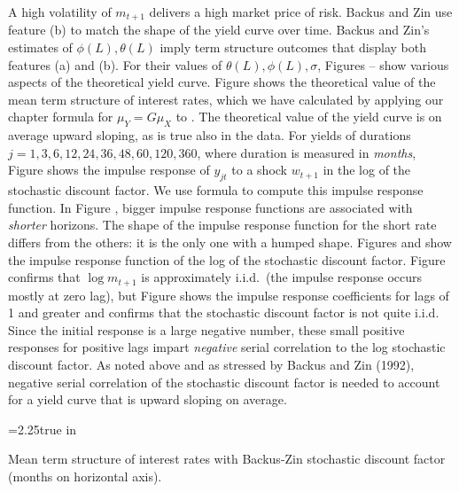 A high volatility of $m_{t+1}$ delivers a high market price of risk.
Backus and Zin use feature (b) to match
the shape of the yield curve over time.
   Backus and Zin's estimates of
$\phi(L), \theta(L)$ imply term structure
outcomes that display both features (a) and (b).
For  their values of $\theta(L), \phi(L), \sigma$,
Figures -- show various
aspects of the theoretical yield curve.
Figure  shows the theoretical value of the
 mean term structure of interest rates, which we
have calculated by applying our chapter   formula for $\mu_Y
= G \mu_X$ to . The theoretical value of the
yield curve is on average upward sloping, as is true
also in the data.   For yields of durations
  $j=1,3,6,12,24,36,48,60,120,360$,
where duration is measured in {\it months\/},
Figure  shows the impulse response of $y_{jt}$   to a shock
$w_{t+1}$ in the log of the stochastic discount factor. We use
formula  to compute this impulse response function.
 In Figure , bigger impulse response
functions are associated with {\it shorter\/} horizons.
The shape of the impulse response function for the short rate
differs from the others: it is the only one with a humped shape.
Figures  and  show the impulse response function
of the log of the stochastic discount factor. Figure  confirms that
$\log m_{t+1}$ is approximately i.i.d.\ (the impulse response occurs mostly
at zero lag), but Figure  shows the impulse response coefficients
for lags of 1 and greater and confirms that the stochastic discount factor
is not quite i.i.d.  Since the initial response   is a large
negative number, these small positive responses for positive lags
impart {\it negative\/}
serial correlation to the log stochastic
discount factor.  As noted above and as stressed by
Backus and Zin (1992),  negative
serial correlation of the stochastic discount factor is needed to
account for a yield curve that is  upward sloping on average.

\centerline{\epsfxsize=2.25true in}
 \caption{Mean term structure of interest rates with Backus-Zin
stochastic discount factor (months on horizontal axis).}
\endfigure



